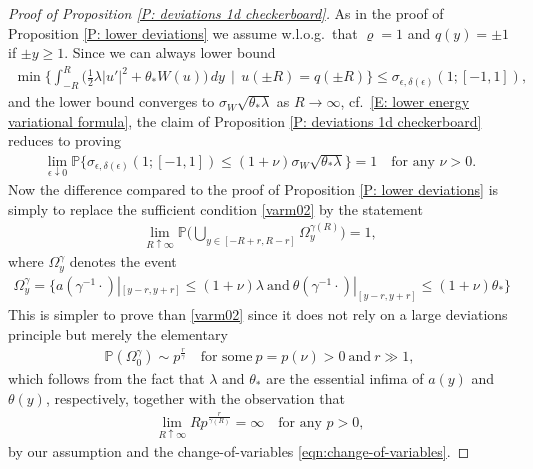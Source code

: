 \documentclass[12pt]{amsart}
\begin{document}
\begin{proof}[Proof of Proposition \ref{P: deviations 1d checkerboard}]
	As in the proof of Proposition \ref{P: lower deviations} we assume w.l.o.g.~that $ \varrho = 1 $ and $ q ( y ) = \pm 1 $ if $ \pm y \geq 1 $. Since we can always lower bound
	\begin{align*}
		\min \Big\{ \int_{-R}^{R} \Big( \frac{1}{2}\lambda |u'|^{2} + \theta_{*} W(u) \Big) \, dy \, \mid \, u(\pm R) = q(\pm R) \Big\}
		\leq \sigma_{ \epsilon, \delta ( \epsilon ) } ( 1; [ - 1, 1 ] ) ,
	\end{align*}
	and the lower bound converges to $  \sigma_{W} \sqrt{ \theta_{*} \lambda } $ as $ R \rightarrow \infty $, cf.~\eqref{E: lower energy variational formula}, the claim of Proposition \ref{P: deviations 1d checkerboard} reduces to proving
	\begin{align*}
		\lim_{ \epsilon \downarrow 0 } \mathbb{P} \big\{ \sigma_{ \epsilon, \delta ( \epsilon ) } ( 1 ; [ - 1, 1 ] ) \leq ( 1 + \nu ) \sigma_{W} \sqrt{ \theta_{*} \lambda } \big\} = 1
		\quad \text{for any } \nu > 0 .
	\end{align*}
	Now the difference compared to the proof of Proposition \ref{P: lower deviations} is simply to replace the sufficient condition \eqref{varm02} by the statement
	\begin{align}
		\lim_{ R \uparrow \infty } \mathbb{P} \big( \bigcup_{ y \in [ -R + r, R - r ] } \Omega_y^{ \gamma(R) }  \big) = 1 ,
	\end{align}
    where $ \Omega_y^{ \gamma } $ denotes the event
    \begin{align*}
        \Omega_{ y }^{ \gamma } = \{  a ( \gamma^{-1} \cdot ) |_ { [ y - r , y + r ] } \leq ( 1 + \nu ) \lambda ~ \text{and} ~ \theta ( \gamma^{-1} \cdot ) |_ { [ y - r , y + r ] } \leq ( 1 + \nu )  \theta_* \}
    \end{align*}
	This is simpler to prove than \eqref{varm02} since it does not rely on a large deviations principle but merely the elementary
	\begin{align}
		\mathbb{P} (  \Omega_0^{ \gamma } )
		\sim p^{ \frac{ r }{ \gamma } }
		\quad \text{for~some} ~ p = p(\nu) > 0 ~ \text{and} ~ r \gg 1,
	\end{align}
	which follows from the fact that $\lambda$ and $\theta_{*}$ are the essential infima of $a(y)$ and $\theta(y)$, respectively,
	together with the observation that
	\begin{align}
		\lim_{ R \uparrow \infty } R p^{ \frac{ r }{ \gamma(R) } } = \infty 
		\quad \text{for~any } p > 0,
	\end{align}
	by our assumption and the change-of-variables \eqref{eqn:change-of-variables}.
\end{proof}
\end{document}
